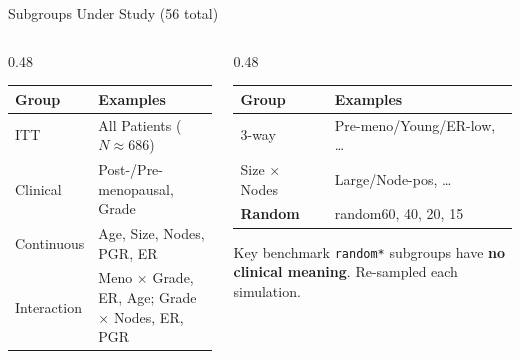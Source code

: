 \documentclass[
  11pt,
  ignorenonframetext,
  aspectratio=169,
]{beamer}
\begin{document}
\begin{frame}{Subgroups Under Study (56 total)}
\protect{}\label{subgroups-under-study-56-total}
\footnotesize
\begin{columns}[T]
\begin{column}{0.48\textwidth}
\begin{tabular}{lp{3.5cm}}
\toprule
\textbf{Group} & \textbf{Examples} \\
\midrule
ITT & All Patients ($N\!\approx\!686$) \\
Clinical & Post-/Pre-menopausal, Grade \\
Continuous & Age, Size, Nodes, PGR, ER \\
Interaction & Meno $\times$ Grade, ER, Age; Grade $\times$ Nodes, ER, PGR \\
\bottomrule
\end{tabular}
\end{column}
\begin{column}{0.48\textwidth}
\begin{tabular}{lp{3.5cm}}
\toprule
\textbf{Group} & \textbf{Examples} \\
\midrule
3-way & Pre-meno/Young/ER-low, \ldots \\
Size $\times$ Nodes & Large/Node-pos, \ldots \\
\textcolor{randomorange}{\textbf{Random}} & \textcolor{randomorange}{random60, 40, 20, 15} \\
\bottomrule
\end{tabular}

\medskip

\begin{alertblock}{\footnotesize Key benchmark}
\textcolor{randomorange}{\texttt{random*}} subgroups have
\textbf{no clinical meaning}. Re-sampled each simulation.
\end{alertblock}
\end{column}
\end{columns}
\end{frame}
\end{document}
